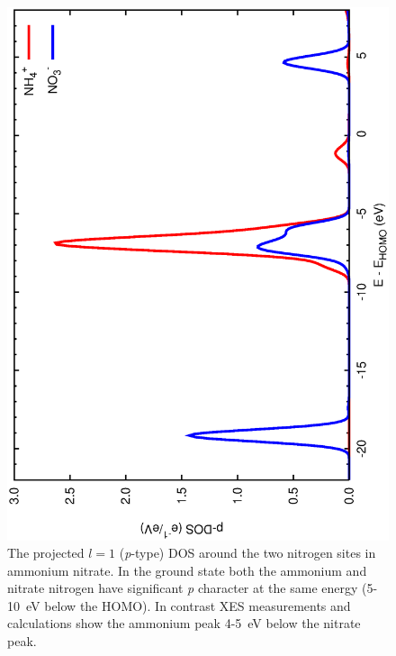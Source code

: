 \documentclass[11pt]{report}
\begin{document}
\begin{figure}
\center
\includegraphics[angle=270,width=4.5in]{AN_pdos.eps}
\caption{ The projected $l=1$ ({\it p}-type) DOS around the two nitrogen sites in ammonium nitrate. In the ground state both the ammonium and nitrate nitrogen have significant {\it p} character at the same energy (5-10~eV below the HOMO). In contrast XES measurements and calculations show the ammonium peak 4-5~eV below the nitrate peak. }
\label{an_pdos}
\end{figure}
\end{document}
